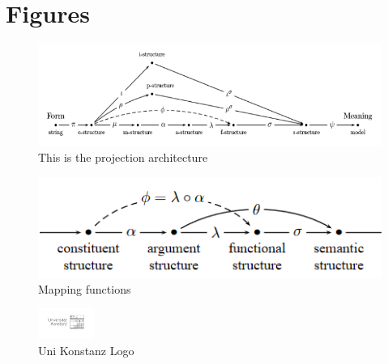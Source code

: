 \chapter{Figures}
\label{ch:figures}



\begin{figure}[!h]  
    \centering
    \includegraphics[scale=0.5]{upload/tex/figures/parallelprojection.png}
    \caption{This is the projection architecture}
    \label{fig-label1}
\end{figure}

\begin{figure}[!b]  
    \centering
    \includegraphics[width=.9\textwidth]{upload/tex/figures/mapping-functions.png}
    \caption{Mapping functions}
    \label{fig-label1}
\end{figure}

\begin{figure}[!t]  
    \centering
    \includegraphics[height=1cm]{upload/tex/figures/UniKonstanz-Logo-Optimum-sRGB.jpg}
    \caption{Uni Konstanz Logo}
    \label{fig-label1}
\end{figure}